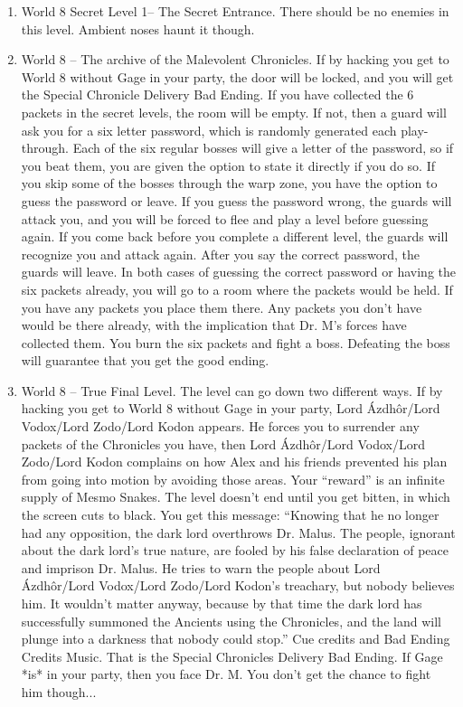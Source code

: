 \documentclass{gd-document}
\begin{document}
\begin{enumerate}
\begin{enumerate}
    \item World 8 Secret Level 1– The Secret Entrance. There should be
      no enemies in this level. Ambient noses haunt it though.

    \item World 8 – The archive of the Malevolent Chronicles. If by
      hacking you get to World 8 without Gage in your party, the door
      will be locked, and you will get the Special Chronicle Delivery
      Bad Ending. If you have collected the 6 packets in the secret
      levels, the room will be empty. If not, then a guard will ask
      you for a six letter password, which is randomly generated each
      play-through. Each of the six regular bosses will give a letter
      of the password, so if you beat them, you are given the option
      to state it directly if you do so. If you skip some of the
      bosses through the warp zone, you have the option to guess the
      password or leave. If you guess the password wrong, the guards
      will attack you, and you will be forced to flee and play a level
      before guessing again. If you come back before you complete a
      different level, the guards will recognize you and attack
      again. After you say the correct password, the guards will
      leave. In both cases of guessing the correct password or having
      the six packets already, you will go to a room where the packets
      would be held. If you have any packets you place them there. Any
      packets you don't have would be there already, with the
      implication that Dr. M's forces have collected them. You burn
      the six packets and fight a boss. Defeating the boss will
      guarantee that you get the good ending.

    \item World 8 – True Final Level. The level can go down two
      different ways.  If by hacking you get to World 8 without Gage
      in your party,  Lord Ázdhôr/Lord Vodox/Lord Zodo/Lord Kodon
      appears. He forces you to surrender any packets of the
      Chronicles you have, then Lord Ázdhôr/Lord Vodox/Lord Zodo/Lord
      Kodon complains on how Alex and his friends prevented his plan
      from going into motion by avoiding those areas. Your “reward” is
      an infinite supply of Mesmo Snakes. The level doesn't end until
      you get bitten, in which the screen cuts to black. You get this
      message: “Knowing that he no longer had any opposition, the dark
      lord overthrows Dr. Malus. The people, ignorant about the dark
      lord's true nature, are fooled by his false declaration of peace
      and imprison Dr. Malus. He tries to warn the people about Lord
      Ázdhôr/Lord Vodox/Lord Zodo/Lord Kodon's treachary, but nobody
      believes him. It wouldn't matter anyway, because by that time
      the dark lord has successfully summoned the Ancients using the
      Chronicles, and the land will plunge into a darkness that nobody
      could stop.” Cue credits and Bad Ending Credits Music. That is
      the Special Chronicles Delivery Bad Ending. If Gage *is* in your
      party, then you face Dr. M. You don't get the chance to fight
      him though... 


\end{enumerate}
\end{enumerate}
\end{document}
